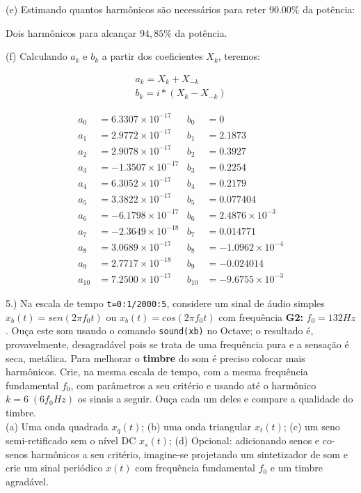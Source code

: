 \documentclass{article}
\begin{document}
\begin{figure}[h!]
    \centering
\end{figure}

(e) Estimando quantos harmônicos são necessários para reter $90.00\%$ da potência:

\vspace{\baselineskip}

Dois harmônicos para alcançar $94,85\% $ da potência.

\vspace{\baselineskip}

(f) Calculando $a_{k}$ e $b_{k}$ a partir dos coeficientes $X_{k}$, teremos:

\begin{align*}
    a_{k} = X_{k} + X_{-k}\\
    b_{k} = i*(X_{k} - X_{-k})
\end{align*}

\begin{align*}
    a_{0} &= 6.3307\times 10^{-17}   &   b_{0} &= 0\\
    a_{1} &= 2.9772\times 10^{-17}   &   b_{1} &= 2.1873\\
    a_{2} &= 2.9078\times 10^{-17}   &   b_{2} &= 0.3927\\
    a_{3} &= -1.3507\times 10^{-17}  &   b_{3} &= 0.2254\\
    a_{4} &= 6.3052\times 10^{-17}   &   b_{4} &= 0.2179\\
    a_{5} &= 3.3822\times 10^{-17}   &   b_{5} &= 0.077404\\
    a_{6} &= -6.1798\times 10^{-17}  &   b_{6} &= 2.4876\times 10^{-3}\\
    a_{7} &= -2.3649\times 10^{-18}  &   b_{7} &= 0.014771\\
    a_{8} &= 3.0689\times 10^{-17}   &   b_{8} &= -1.0962\times 10^{-4}\\
    a_{9} &= 2.7717\times 10^{-18}   &   b_{9} &= -0.024014\\
    a_{10} &= 7.2500\times 10^{-17}  &   b_{10} &= -9.6755\times 10^{-3}
\end{align*}

5.) Na escala de tempo {\tt t=0:1/2000:5}, considere um sinal de áudio simples $x_{b}(t) = sen(2 \pi f_{0}t)$ ou $x_{b}(t) = cos(2 \pi f_{0}t)$ com frequência \textbf{G2:} $f_{0} = 132Hz$. Ouça este som usando o comando {\tt sound(xb)} no Octave; o resultado é, provavelmente, desagradável pois se trata de uma frequência pura e a sensação é seca, metálica. Para melhorar o \textbf{timbre} do som é preciso colocar mais harmônicos. Crie, na mesma escala de tempo, com a mesma frequência fundamental $f_{0}$, com parâmetros a seu critério e usando até o harmônico $k = 6\;(6f_{0}Hz)$ os sinais a seguir. Ouça cada um deles e compare a qualidade do timbre.\\
(a) Uma onda quadrada $x_{q}(t)$;
(b) uma onda triangular $x_{t}(t)$;
(c) um seno semi-retificado sem o nível DC $x_{s}(t)$;
(d) Opcional: adicionando senos e co-senos harmônicos a seu critério, imagine-se projetando um sintetizador de som e crie um sinal periódico $x(t)$ com frequência fundamental $f_{0}$ e um timbre agradável.
\end{document}

